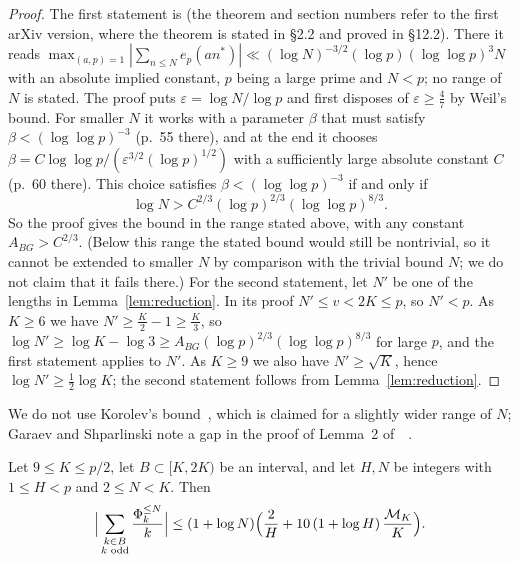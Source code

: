 \begin{proof}
The first statement is \cite[Theorem~16]{b8} (the theorem and section numbers refer to the first arXiv version, where
the theorem is stated in \S2.2 and proved in \S12.2). There it reads
$\max_{(a,p)=1}|\sum_{n\le N}e_p(an^*)|\ll(\log N)^{-3/2}(\log p)(\log\log p)^3N$ with an absolute implied constant,
$p$ being a large prime and $N<p$; no range of $N$ is stated. The proof puts $\varepsilon=\log N/\log p$ and first
disposes of $\varepsilon\ge\frac47$ by Weil's bound. For smaller $N$ it works with a parameter $\beta$ that must satisfy
$\beta<(\log\log p)^{-3}$ (p.~55 there), and at the end it chooses
$\beta=C\log\log p/(\varepsilon^{3/2}(\log p)^{1/2})$ with a sufficiently large absolute constant $C$ (p.~60 there).
This choice satisfies $\beta<(\log\log p)^{-3}$ if and only if
\[
\log N>C^{2/3}(\log p)^{2/3}(\log\log p)^{8/3}.
\]
So the proof gives the bound in the range stated above, with any constant $A_{BG}>C^{2/3}$. (Below this range the stated bound would still be nontrivial, so it cannot be extended to smaller $N$ by
comparison with the trivial bound $N$; we do not claim that it fails there.) For the second statement, let $N'$ be one
of the lengths in Lemma~\ref{lem:reduction}. In its proof $N'\le v<2K\le p$, so $N'<p$. As $K\ge6$ we have
$N'\ge\frac K2-1\ge\frac K3$, so $\log N'\ge\log K-\log3\ge A_{BG}(\log p)^{2/3}(\log\log p)^{8/3}$ for large $p$,
and the first statement applies to $N'$. As $K\ge9$ we also have $N'\ge\sqrt K$, hence $\log N'\ge\frac12\log K$; the
second statement follows from Lemma~\ref{lem:reduction}.
\end{proof}

We do not use Korolev's bound~\cite[Theorem~2]{b17}, which is claimed for a slightly wider range of $N$; Garaev and Shparlinski note a gap in the proof of Lemma~2 of~\cite{b17}~\cite[Section~1.1]{b12}.


\begin{lemma}[Heads]\label{lem:heads}
Let $9\le K\le p/2$, let $B\subset[K,2K)$ be an interval, and let $H,N$ be integers with $1\le H<p$ and $2\le N<K$.
Then
\[
\Big|\sum_{\substack{k\in B\\ k\text{ odd}}}\frac{\Phi_k^{\le N}}{k}\Big|\le(1+\log N)\Bigl(\frac2H+10\,(1+\log H)\,
\frac{\mathcal{M}_K}{K}\Bigr).
\]
\end{lemma}


